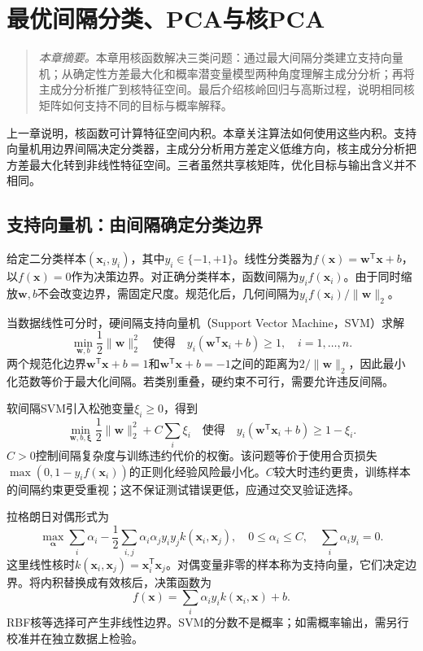 \chapter{最优间隔分类、PCA与核PCA}
\label{chap:kernel-algorithms}
\begin{quote}\small
\textit{本章摘要。}本章用核函数解决三类问题：通过最大间隔分类建立支持向量机；从确定性方差最大化和概率潜变量模型两种角度理解主成分分析；再将主成分分析推广到核特征空间。最后介绍核岭回归与高斯过程，说明相同核矩阵如何支持不同的目标与概率解释。
\end{quote}

上一章说明，核函数可计算特征空间内积。本章关注算法如何使用这些内积。支持向量机用边界间隔决定分类器，主成分分析用方差定义低维方向，核主成分分析把方差最大化转到非线性特征空间。三者虽然共享核矩阵，优化目标与输出含义并不相同。

\section{支持向量机：由间隔确定分类边界}
给定二分类样本$(\bm x_i,y_i)$，其中$y_i\in\{-1,+1\}$。线性分类器为$f(\bm x)=\bm w^{\mathsf T}\bm x+b$，以$f(\bm x)=0$作为决策边界。对正确分类样本，函数间隔为$y_i f(\bm x_i)$。由于同时缩放$\bm w,b$不会改变边界，需固定尺度。规范化后，几何间隔为$y_i f(\bm x_i)/\|\bm w\|_2$。

当数据线性可分时，硬间隔支持向量机（Support Vector Machine，SVM）求解
\begin{equation}
 \min_{\bm w,b}\frac12\|\bm w\|_2^2
 \quad\text{使得}\quad y_i(\bm w^{\mathsf T}\bm x_i+b)\geq1,\quad i=1,\ldots,n.
 \label{eq:svm-hard-margin-primal}
\end{equation}
两个规范化边界$\bm w^{\mathsf T}\bm x+b=1$和$\bm w^{\mathsf T}\bm x+b=-1$之间的距离为$2/\|\bm w\|_2$，因此最小化范数等价于最大化间隔。若类别重叠，硬约束不可行，需要允许违反间隔。

软间隔SVM引入松弛变量$\xi_i\geq0$，得到
\begin{equation}
 \min_{\bm w,b,\bm\xi}\frac12\|\bm w\|_2^2+C\sum_i\xi_i
 \quad\text{使得}\quad y_i(\bm w^{\mathsf T}\bm x_i+b)\geq1-\xi_i.
 \label{eq:svm-soft-margin-primal}
\end{equation}
$C>0$控制间隔复杂度与训练违约代价的权衡。该问题等价于使用合页损失$\max(0,1-y_if(\bm x_i))$的正则化经验风险最小化。$C$较大时违约更贵，训练样本的间隔约束更受重视；这不保证测试错误更低，应通过交叉验证选择。

拉格朗日对偶形式为
\begin{equation}
 \max_{\bm\alpha}\sum_i\alpha_i-\frac12\sum_{i,j}\alpha_i\alpha_jy_iy_jk(\bm x_i,\bm x_j),
 \quad 0\leq\alpha_i\leq C,\quad \sum_i\alpha_iy_i=0.
 \label{eq:svm-dual}
\end{equation}
这里线性核时$k(\bm x_i,\bm x_j)=\bm x_i^{\mathsf T}\bm x_j$。对偶变量非零的样本称为支持向量，它们决定边界。将内积替换成有效核后，决策函数为
\begin{equation}
 f(\bm x)=\sum_i\alpha_i y_i k(\bm x_i,\bm x)+b.
\end{equation}
RBF核等选择可产生非线性边界。SVM的分数不是概率；如需概率输出，需另行校准并在独立数据上检验。

